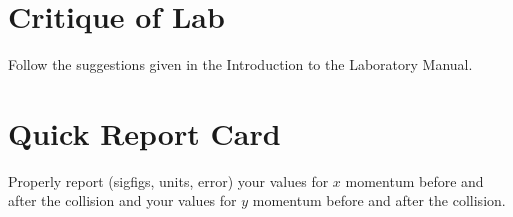 \section*{Critique of Lab}
     Follow the suggestions given in the Introduction to the
Laboratory Manual.

\section*{Quick Report Card}
Properly report (sigfigs, units, error) your values for $x$
momentum before and after the collision and your values for $y$
momentum before and after the collision.
